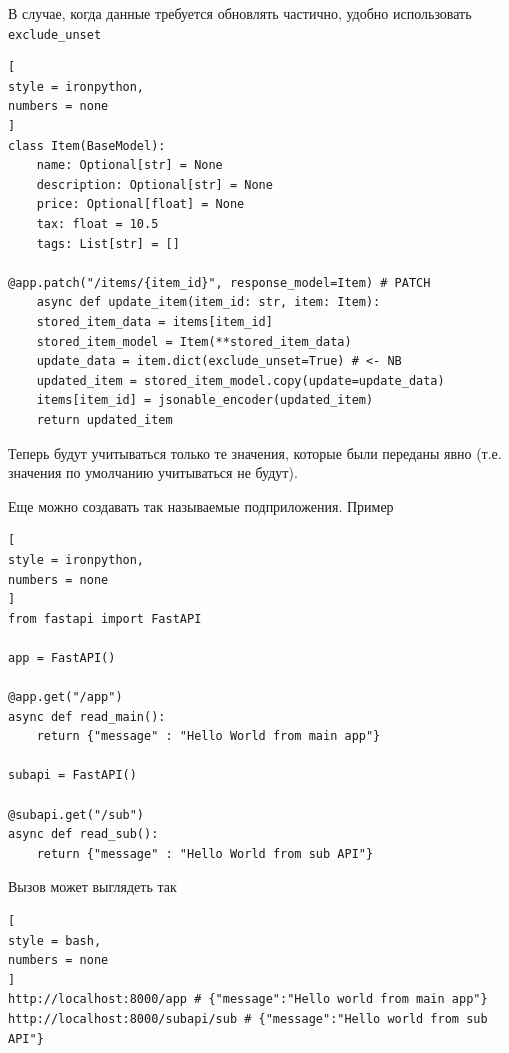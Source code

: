 \documentclass[%
	11pt,
	a4paper,
	utf8,
		]{article}
\begin{document}
В случае, когда данные требуется обновлять частично, удобно использовать \texttt{exclude\_unset}
\begin{lstlisting}[
style = ironpython,
numbers = none	
]
class Item(BaseModel):
	name: Optional[str] = None
	description: Optional[str] = None
	price: Optional[float] = None
	tax: float = 10.5
	tags: List[str] = []

@app.patch("/items/{item_id}", response_model=Item) # PATCH
	async def update_item(item_id: str, item: Item):
	stored_item_data = items[item_id]
	stored_item_model = Item(**stored_item_data)
	update_data = item.dict(exclude_unset=True) # <- NB
	updated_item = stored_item_model.copy(update=update_data)
	items[item_id] = jsonable_encoder(updated_item)
	return updated_item
\end{lstlisting}

Теперь будут учитываться только те значения, которые были переданы явно (т.е. значения по умолчанию учитываться не будут).

Еще можно создавать так называемые подприложения. Пример
\begin{lstlisting}[
style = ironpython,
numbers = none	
]
from fastapi import FastAPI

app = FastAPI()

@app.get("/app")
async def read_main():
    return {"message" : "Hello World from main app"}
    
subapi = FastAPI()

@subapi.get("/sub")
async def read_sub():
    return {"message" : "Hello World from sub API"}
\end{lstlisting}

Вызов может выглядеть так
\begin{lstlisting}[
style = bash,
numbers = none	
]
http://localhost:8000/app # {"message":"Hello world from main app"}
http://localhost:8000/subapi/sub # {"message":"Hello world from sub API"}
\end{lstlisting}
\end{document}
